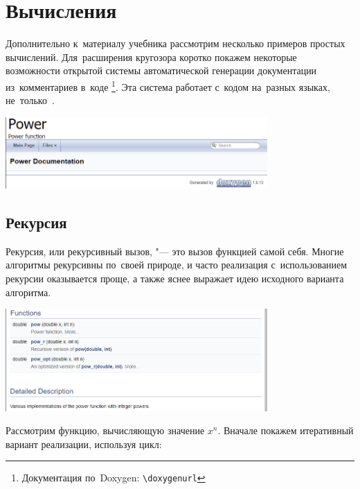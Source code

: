
\chapter{Вычисления}
Дополнительно к~материалу учебника рассмотрим несколько примеров простых вычислений. Для~расширения кругозора коротко покажем некоторые возможности открытой системы автоматической генерации документации из~комментариев в~коде \href{\doxygenurl}{}\footnote{Документация по~Doxygen: \nolinkurl{\doxygenurl}}. Эта система работает с~кодом на~разных языках, не~только~.

\begin{center}
  \includegraphics[width=0.75\textwidth]{images/doxygen_main_page.png}
\end{center}



\section{Рекурсия}
Рекурсия, или рекурсивный вызов, "--- это вызов функцией самой себя. Многие алгоритмы рекурсивны по~своей природе, и часто реализация с~использованием рекурсии оказывается проще, а также яснее выражает идею исходного варианта алгоритма.

\begin{center}
  \includegraphics[width=0.75\textwidth]{images/doxygen_overview.png}
\end{center}

Рассмотрим функцию, вычисляющую значение \(x^n\). Вначале покажем итеративный вариант реализации, используя цикл:


